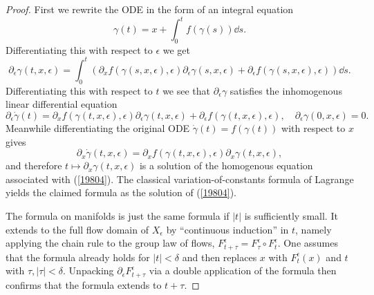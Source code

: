 \begin{proof}
    First we rewrite the ODE in the form of an integral equation
    \[\gamma(t)=x+\int_0^t f(\gamma(s))\dd s.\]
    Differentiating this with respect to $\epsilon$ we get
    \[\partial_\epsilon\gamma(t,x,\epsilon)=\int_0^t \left(\partial_x f(\gamma(s,x,\epsilon),\epsilon)\partial_\epsilon\gamma(s,x,\epsilon)+\partial_\epsilon f(\gamma(s,x,\epsilon),\epsilon)\right)\dd s.\]
    Differentiating this with respect to $t$ we see that $\partial_\epsilon \gamma$ satisfies the inhomogenous linear differential equation
    \[\partial_\epsilon \dot\gamma(t)=\partial_xf(\gamma(t,x,\epsilon),\epsilon)\partial_\epsilon \gamma(t,x,\epsilon)+\partial_\epsilon f(\gamma(t,x,\epsilon),\epsilon),\quad \partial_\epsilon\gamma(0,x,\epsilon)=0.\label{19804}\]
    Meanwhile differentiating the original ODE $\dot\gamma(t)=f(\gamma(t))$ with respect to $x$ gives
    \[ \partial_x\dot \gamma(t,x,\epsilon)=\partial_xf(\gamma(t,x,\epsilon),\epsilon)\partial_x\gamma(t,x,\epsilon),\]
    and therefore $t\mapsto \partial_x \gamma(t,x,\epsilon)$ is a solution of the homogenous equation associated with (\ref{19804}). The classical variation-of-constants formula of Lagrange yields the claimed formula as the solution of (\ref{19804}).

    The formula on manifolds is just the same formula if $|t|$ is sufficiently small. It extends to the full flow domain of $X_\epsilon$ by ``continuous induction'' in $t$, namely applying the chain rule to the group law of flows, $F^\epsilon_{t+\tau}=F^\epsilon_\tau\circ F^\epsilon_t$. One assumes that the formula already holds for $|t|<\delta$ and then replaces $x$ with $F_t^\epsilon(x)$ and $t$ with $\tau,|\tau|<\delta$. Unpacking $\partial_\epsilon F_{t+\tau}^{\epsilon}$ via a double application of the formula then confirms that the formula extends to $t+\tau$.
\end{proof}

